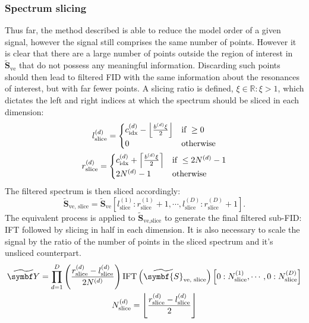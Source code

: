 \subsubsection{Spectrum slicing}
Thus far, the method described is able to reduce the model order of a given
signal, however the signal still comprises the same number of points. However
it is clear that there are a large number of points outside the region of
interest in $\widetilde{\symbf{S}}_{\text{ve}}$ that do not possess any
meaningful information. Discarding such points should then lead to filtered
\ac{FID} with the same information about the resonances of interest, but with
far fewer points. A slicing ratio is defined, $\xi \in \mathbb{R}: \xi > 1$,
which dictates the left and right indices at which the spectrum should be sliced
in each dimension:
\begin{subequations}
    \begin{gather}
        l_{\text{slice}}^{(d)} =
        \begin{cases}
            c_{\text{idx}}^{(d)} - \left \lfloor \frac{b^{(d)} \xi}{2} \right \rfloor &
            \text{if } \geq 0 \\
            0 & \text{otherwise}
        \end{cases} \\
        r_{\text{slice}}^{(d)} =
        \begin{cases}
            c_{\text{idx}}^{(d)} + \left \lceil \frac{b^{(d)} \xi}{2} \right \rceil &
            \text{if } \leq 2 N^{(d)} - 1 \\
            2 N^{(d)} - 1 & \text{otherwise}
        \end{cases}
    \end{gather}
\end{subequations}
The filtered spectrum is then sliced accordingly:
\begin{equation}
    \widetilde{\symbf{S}}_{\text{ve, slice}} =
        \widetilde{\symbf{S}}_{\text{ve}} \left[
            l_{\text{slice}}^{(1)} :
            r_{\text{slice}}^{(1)} + 1,
            \cdots,
            l_{\text{slice}}^{(D)} :
            r_{\text{slice}}^{(D)} + 1
        \right].
\end{equation}
The equivalent process is applied to $\widetilde{\symbf{S}}_{\text{ve,slice}}$
to generate the final filtered sub-\ac{FID}: \ac{IFT} followed by slicing in
half in each dimension.  It is also necessary to scale the signal by the ratio
of the number of points in the sliced spectrum and it's unsliced counterpart.
\begin{subequations}
    \begin{gather}
        \widetilde{\bY} =
            \prod_{d=1}^D \left(\frac{r_{\text{slice}}^{(d)} - l_{\text{slice}}^{(d)}}{2 \Nd}\right)
            \IFT \left( \widetilde{\symbf{S}}_{\text{ve, slice}} \right)
            \left[
                0 : \None_{\text{slice}}, \cdots, 0 : \ND_{\text{slice}}
            \right] \\
            \Nd_{\text{slice}} = \left \lfloor \frac{r_{\text{slice}}^{(d)} - l_{\text{slice}}^{(d)}}{2} \right \rfloor
    \end{gather}
\end{subequations}
